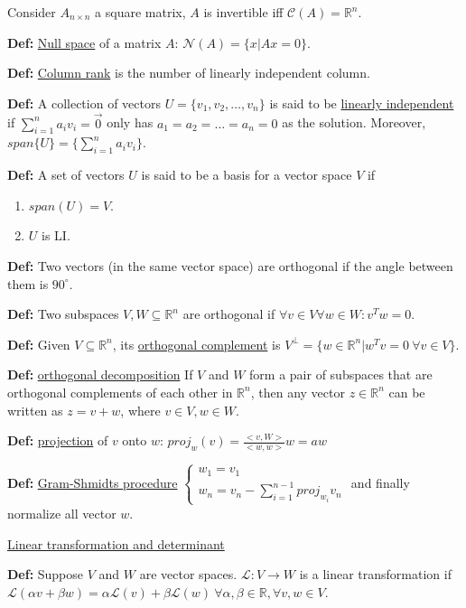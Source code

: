 \documentclass{report}
\begin{document}
Consider $A_{n \times n}$ a square matrix, $A$ is invertible iff
$\mathcal{C}(A) = \mathbb{R}^{n}$.

\textbf{Def:} \underline{Null space} of a matrix $A$:
$\mathcal{N}(A) = \{x | Ax = 0\}$.

\textbf{Def:} \underline{Column rank} is the number of linearly independent
column.

\textbf{Def: }A collection of vectors $U = \{v_1, v_2, \dots, v_n\}$ is
said to be \underline{linearly independent} if $\sum_{i=1}^{n} a_i v_i = \vec{0}$
only has $a_1 = a_2 = \dots = a_n = 0$ as the solution. Moreover,
$span\{U\} = \{\sum_{i=1}^{n} a_i v_i\}$.

\textbf{Def:} A set of vectors $U$ is said to be a basis for a vector
space $V$ if
\begin{enumerate}
    \item $span(U) = V$.
    \item $U$ is LI.
\end{enumerate}

\textbf{Def:} Two vectors (in the same vector space) are orthogonal if
the angle between them is $90^\circ$.

\textbf{Def:} Two subspaces $V, W \subseteq \mathbb{R}^n$ are orthogonal if
$\forall v \in V \forall w \in W : v^T w = 0$.

\textbf{Def:} Given $V \subseteq \mathbb{R}^n$, its \underline{orthogonal complement}
is $V^{\perp} = \{w \in \mathbb{R}^n | w^T v = 0 \ \forall v\in V\}$.

\textbf{Def:} \underline{orthogonal decomposition} If $V$ and $W$ form a
pair of subspaces that are orthogonal complements of each other in $\mathbb{R}^n$,
then any vector $z \in \mathbb{R}^n$ can be written as $z = v + w$, where
$v \in V, w \in W$.

\textbf{Def:} \underline{projection} of $v$ onto $w$: $proj_{w}(v) =
    \frac{<v, W>}{<w, w>} w = aw$

\textbf{Def:} \underline{Gram-Shmidts procedure}
$\begin{cases}
        w_1 = v_1 \\
        w_n = v_n - \sum_{i=1}^{n-1} proj_{w_i}v_n
    \end{cases}$
and finally normalize all vector $w$.

\underline{Linear transformation and determinant}

\textbf{Def:} Suppose $V$ and $W$ are vector spaces.
$\mathcal{L}: V \rightarrow W$ is a linear transformation if
$\mathcal{L}(\alpha v + \beta w) = \alpha \mathcal{L}(v) +
    \beta \mathcal{L}(w) \ \forall \alpha, \beta \in \mathbb{R}, \forall
    v, w \in V$.
\end{document}
